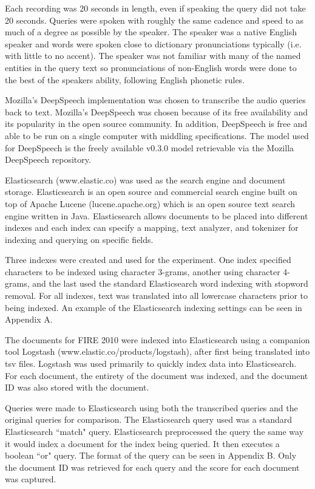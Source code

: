 \documentclass[jair, twoside,11pt,theapa]{article}
\begin{document}
Each recording was 20 seconds in length, even if speaking the query did not take 20 seconds. Queries were spoken with roughly the same cadence and speed to as much of a degree as possible by the speaker. The speaker was a native English speaker and words were spoken close to dictionary pronunciations typically (i.e. with little to no accent). The speaker was not familiar with many of the named entities in the query text so pronunciations of non-English words were done to the best of the speakers ability, following English phonetic rules. 

Mozilla's DeepSpeech implementation was chosen to transcribe the audio queries back to text. Mozilla's DeepSpeech was chosen because of its free availability and its popularity in the open source community. In addition, DeepSpeech is free and able to be run on a single computer with middling specifications. The model used for DeepSpeech is the freely available v0.3.0 model retrievable via the Mozilla DeepSpeech repository.

Elasticsearch (www.elastic.co) was used as the search engine and document storage. Elasticsearch is an open source and commercial search engine built on top of Apache Lucene (lucene.apache.org) which is an open source text search engine written in Java. Elasticsearch allows documents to be placed into different indexes and each index can specify a mapping, text analyzer, and tokenizer for indexing and querying on specific fields. 

Three indexes were created and used for the experiment. One index specified characters to be indexed using character 3-grams, another using character 4-grams, and the last used the standard Elasticsearch word indexing with stopword removal. For all indexes, text was translated into all lowercase characters prior to being indexed. An example of the Elasticsearch indexing settings can be seen in Appendix A. 

The documents for FIRE 2010 were indexed into Elasticsearch using a companion tool Logstash (www.elastic.co/products/logstash), after first being translated into tsv files. Logstash was used primarily to quickly index data into Elasticsearch. For each document, the entirety of the document was indexed, and the document ID was also stored with the document. 

Queries were made to Elasticsearch using both the transcribed queries and the original queries for comparison. The Elasticsearch query used was a standard Elasticsearch ``match" query. Elasticsearch preprocessed the query the same way it would index a document for the index being queried. It then executes a boolean ``or" query. The format of the query can be seen in Appendix B. Only the document ID was retrieved for each query and the score for each document was captured. 
\end{document}
